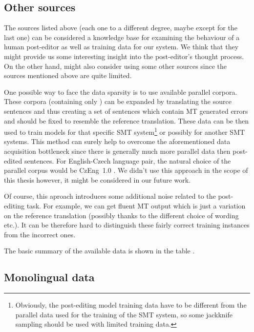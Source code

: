 \subsection{Other sources}

The sources listed above (each one to a different degree, maybe except for the last one) can
be considered a knowledge base for examining the behaviour of a human post-editor as well
as training data for our system. We think that they might provide us
some interesting insight into the post-editor's thought process. On the other hand,
might also consider using some other sources since the sources mentioned above are quite
limited.

One possible way to face the data sparsity is to use available parallel corpora.
These corpora (containing only )
can be expanded by translating the source sentences and thus creating a set of 
sentences which contain MT generated errors and should be fixed to resemble the 
reference translation. These data can be then used to train models for that
specific SMT system\footnote{Obviously, the post-editing model training data have to be
different from the parallel data used for the training of the SMT system, so
some
jackknife sampling should be used with limited training data.} or possibly for
another SMT systems.
This method can surely help to overcome the aforementioned data acquisition bottleneck
since there is generally much more parallel data then post-edited sentences. For
English-Czech language pair, the natural choice of the parallel corpus would be
CzEng~1.0 \cite{czeng10:lrec2012}.
We didn't use this approach in the scope of this thesis however, it might
be considered in our future work.

Of course, this aproach introduces some additional noise
related to the post-editing task. For example, we can get fluent MT output which
is just a variation on the reference translation (possibly thanks to the different
choice of wording etc.). It can be therefore hard to distinguish these fairly correct training
instances from the incorrect ones.

The basic summary of the available data is shown in the table .

\subsection{Monolingual data}

